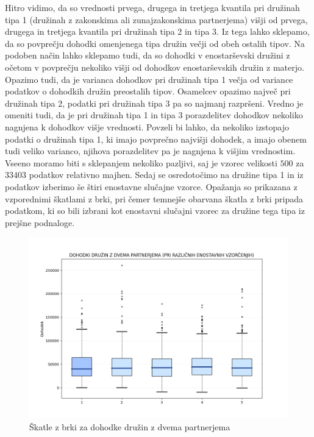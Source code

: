 \documentclass{article}
\begin{document}
Hitro vidimo, da so vrednosti prvega, drugega in tretjega kvantila pri družinah tipa 1 (družinah z zakonskima ali zunajzakonskima partnerjema) višji od prvega, drugega in tretjega kvantila pri družinah tipa 2 in tipa 3. 
Iz tega lahko sklepamo, da so  povprečju dohodki omenjenega tipa družin večji od obeh ostalih tipov. Na podoben način lahko sklepamo tudi, da so dohodki v enostarševski družini z očetom v povprečju nekoliko višji od dohodkov enostarševskih družin z materjo. 
Opazimo tudi, da je varianca dohodkov pri družinah tipa 1 večja od variance podatkov o dohodkih družin preostalih tipov. 
Osamelcev opazimo največ pri družinah tipa 2, podatki pri družinah tipa 3 pa so najmanj razpršeni. 
Vredno je omeniti tudi, da je pri družinah tipa 1 in tipa 3 porazdelitev dohodkov nekoliko nagnjena k dohodkov višje vrednosti.
\newline
Povzeli bi lahko, da nekoliko izstopajo podatki o družinah tipa 1, ki imajo povprečno najvišji dohodek, a imajo obenem tudi veliko varianco, njihova porazdelitev pa je nagnjena k višjim vrednostim.
Vseeno moramo biti s sklepanjem nekoliko pazljivi, saj je vzorec velikosti $500$ za $33403$ podatkov relativno majhen.
\newline
\newline
Sedaj se osredotočimo na družine tipa 1 in iz podatkov izberimo še štiri enostavne slučajne vzorce. 
Opažanja so prikazana z vzporednimi škatlami z brki, pri čemer temnejše obarvana škatla z brki pripada podatkom, ki so bili izbrani kot enostavni slučajni vzorec za družine tega tipa iz prejšne podnaloge.

\begin{figure}[H]
    \begin{center}
    \includegraphics[width=\linewidth]{naloga1b.png}
    \vspace*{-10mm}\caption{Škatle z brki za dohodke družin z dvema partnerjema}
    \end{center}    
\end{figure}
\end{document}
